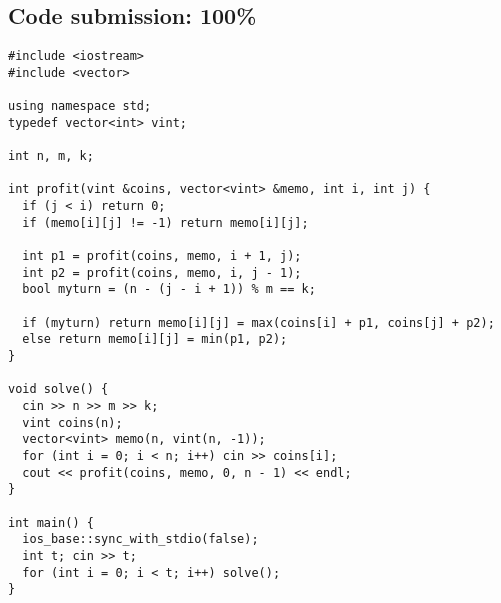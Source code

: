 \documentclass[12pt,letterpaper]{article}
\begin{document}
\small
\subsection*{Code submission: 100\%}
\begin{verbatim}
#include <iostream>
#include <vector>

using namespace std;
typedef vector<int> vint;

int n, m, k;

int profit(vint &coins, vector<vint> &memo, int i, int j) {
  if (j < i) return 0;
  if (memo[i][j] != -1) return memo[i][j];
  
  int p1 = profit(coins, memo, i + 1, j);
  int p2 = profit(coins, memo, i, j - 1);
  bool myturn = (n - (j - i + 1)) % m == k;
  
  if (myturn) return memo[i][j] = max(coins[i] + p1, coins[j] + p2);
  else return memo[i][j] = min(p1, p2);
}

void solve() {
  cin >> n >> m >> k;
  vint coins(n);
  vector<vint> memo(n, vint(n, -1));
  for (int i = 0; i < n; i++) cin >> coins[i];
  cout << profit(coins, memo, 0, n - 1) << endl;
}

int main() {
  ios_base::sync_with_stdio(false);
  int t; cin >> t;
  for (int i = 0; i < t; i++) solve();
}
\end{verbatim}
\end{document}
